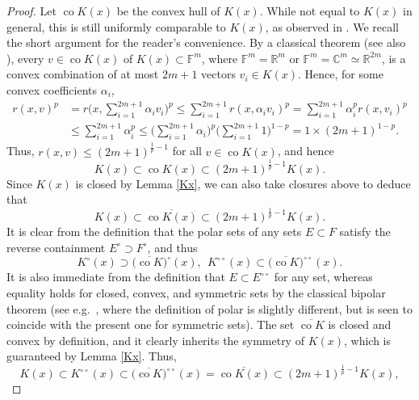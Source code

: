 \documentclass[11pt, reqno]{amsart}
\theoremstyle{definition}
\theoremstyle{remark}
\numberwithin{equation}{section}
\newcommand{\C}{\mathbb C}
\newcommand{\F}{\mathbb F}
\newcommand{\R}{\mathbb R}
\newcommand{\co}{\operatorname{co}}
\begin{document}
\begin{proof}
Let $\co K(x)$ be the convex hull of $K(x)$.
While not equal to $K(x)$ in general,
this is still uniformly comparable to $K(x)$,
as observed in \cite[p.\,1237]{FR04}.
We recall the short argument for the reader's convenience.
By a classical theorem \cite{Car07}
(see also \cite[Theorem 17.1]{Rock}),
every $v\in\operatorname{co}K(x)$ of $K(x)\subset\F^m$,
where $\F^m=\R^m$ or $\F^m=\C^m\simeq\R^{2m}$,
is a convex combination of at most $2m+1$ vectors $v_i\in K(x)$.
Hence, for some convex coefficients $\alpha_i$,
\begin{align*}
r(x,v)^p
&=r\Bigg(x,\sum_{i=1}^{2m+1}\alpha_iv_i\Bigg)^p
\leq\sum_{i=1}^{2m+1}r(x,\alpha_iv_i)^p
=\sum_{i=1}^{2m+1}\alpha_i^p r(x,v_i)^p \\
&\leq \sum_{i=1}^{2m+1}\alpha_i^p
\leq\Bigg(\sum_{i=1}^{2m+1}\alpha_i\Bigg)^p
\Bigg(\sum_{i=1}^{2m+1}1\Bigg)^{1-p}
=1\times(2m+1)^{1-p}.
\end{align*}
Thus, $r(x,v)\leq(2m+1)^{\frac1p-1}$ for all $v\in\co K(x)$, and hence
\begin{equation*}
K(x)\subset \co K(x)\subset (2m+1)^{\frac1p-1}K(x).
\end{equation*}
Since $K(x)$ is closed by Lemma \ref{Kx}, we can also take closures above to deduce that
\begin{equation*}
K(x)\subset \overline{\co K(x)}\subset (2m+1)^{\frac1p-1}K(x).
\end{equation*}
It is clear from the definition that the polar sets of any sets $E\subset F$ satisfy the reverse containment $E^\circ\supset F^\circ$, and thus
\begin{equation*}
K^\circ(x)\supset \Big(\overline{\co K}\Big)^{\circ}(x),\ \
K^{\circ\circ}(x)\subset \Big(\overline{\co K}\Big)^{\circ\circ}(x).
\end{equation*}
It is also immediate from the definition that
$E\subset E^{\circ\circ}$ for any set,
whereas equality holds for closed, convex,
and symmetric sets by the classical bipolar theorem (see e.g.\ \cite[Theorem 14.5]{Rock}, where the definition of polar is slightly different, but is seen to coincide with the present one for symmetric sets).
The set $\overline{\co K}$ is closed and convex by definition,
and it clearly inherits the symmetry of $K(x)$,
which is guaranteed by Lemma \ref{Kx}. Thus,
\begin{equation*}
K(x)
\subset K^{\circ\circ}(x)
\subset \Big(\overline{\co K}\Big)^{\circ\circ}(x)
=\overline{\co K(x)}
\subset(2m+1)^{\frac1p-1}K(x),
\end{equation*}

\end{proof}
\end{document}
